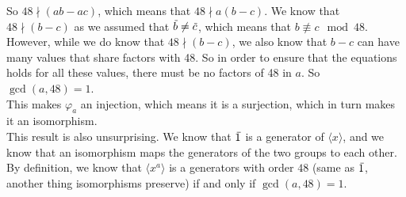 \documentclass[12pt]{article}
\begin{document}
    So $48 \nmid (ab - ac)$,
    which means that $48 \nmid a(b - c)$.
    We know that $48 \nmid (b - c)$
    as we assumed that $\,\overline{\!{b}} \neq \,\overline{\!{c}}$,
    which means that $b \not\equiv c \mod 48$.
    However, while we do know that $48 \nmid (b - c)$,
    we also know that $b - c$ can have many values that
    share factors with 48.
    So in order to ensure that the equations holds for all these values,
    there must be no factors of 48 in $a$.
    So $\gcd(a, 48) = 1$. \\
    This makes $\varphi_a$ an injection,
    which means it is a surjection,
    which in turn makes it an isomorphism. \\
    This result is also unsurprising.
    We know that $\,\overline{\!{1}}$ is a generator of $\langle x \rangle$,
    and we know that an isomorphism maps the generators of the
    two groups to each other.
    By definition, we know that $\langle x^a \rangle$
    is a generators with order $48$
    (same as $\,\overline{\!{1}}$, another thing isomorphisms preserve)
    if and only if $\gcd(a, 48) = 1$.
\end{document}
